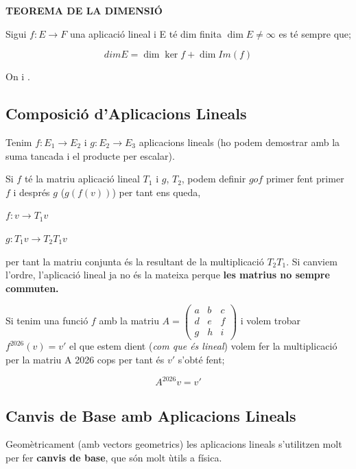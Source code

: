 \documentclass[12pt]{article}
\begin{document}
 
\textbf{TEOREMA DE LA DIMENSIÓ}

Sigui $f:E \rightarrow F$ una aplicació lineal i E té dim finita $\dim E \neq \infty$ es té sempre que;

\[dim E = \dim \ker f + \dim Im(f)\]

On  i .

\subsection{Composició d'Aplicacions Lineals}

Tenim $f: E_1 \rightarrow E_2$ i $g: E_2 \rightarrow E_3$ aplicacions lineals (ho podem demostrar amb la suma tancada i el producte per escalar).

Si $f$ té la matriu aplicació lineal $T_1$ i $g$, $T_2$, podem definir $g o f$ primer fent primer $f$ i després $g$ ($g(f(v))$) per tant ens queda,

$f: v \rightarrow T_1 v$

$g: T_1 v \rightarrow T_2 T_1 v$

per tant la matriu conjunta és la resultant de la multiplicació $T_2 T_1$. Si canviem l'ordre, l'aplicació lineal ja no és la mateixa perque \textbf{les matrius no sempre commuten.}

\begin{examplebox}{}
    Si tenim una funció $f$ amb la matriu $A = \begin{pmatrix}
        a & b & c \\
        d & e & f\\
        g & h & i
    \end{pmatrix}$ i volem trobar $f^{2026}(v) = v'$ el que estem dient (\textit{com que és lineal}) volem fer la multiplicació per la matriu A 2026 cops per tant és $v'$ s'obté fent;

    \[A^{2026} v = v'\]
\end{examplebox}

\subsection{Canvis de Base amb Aplicacions Lineals}

Geomètricament (amb vectors geometrics) les aplicacions lineals s'utilitzen molt per fer \textbf{canvis de base}, que són molt ùtils a física.
\end{document}
